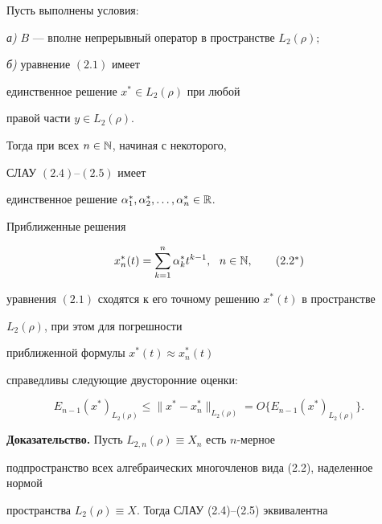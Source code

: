 \begin{thms}


Пусть выполнены условия${:}$





{\em а)} $B$ --- вполне непрерывный оператор в пространстве $L_2(\rho);$


{\em б)} уравнение $(2.1)$ имеет 


единственное решение $x^*\in L_2(\rho)$ при любой


правой части $y\in L_2(\rho)$.





Тогда при всех $n\in \Bbb N$, начиная с некоторого,


СЛАУ $(2.4)$--$(2.5)$ имеет


единственное решение $\alpha_1^*, \alpha_2^*, \dotsc, \alpha_n^* \in \Bbb R$.


Приближенные решения


\begin{equation}


x^*_n(t)=\sum_{k=1}^{n}\alpha_k^*t^{k-1},\ \ n\in \Bbb N,


\tag{$2.2^*$}


\end{equation}


уравнения $(2.1)$ сходятся к его точному решению $x^*(t)$ в пространстве


$L_2(\rho)$, при этом для погрешности


приближенной формулы $x^*(t)\approx x_n^*(t)$


справедливы следующие двусторонние оценки$:$


\begin{equation}


E_{n-1}(x^*)_{L_2(\rho)}\le \|x^*-x^*_n\|_{L_2(\rho)}=


O\{E_{n-1}(x^*)_{L_2(\rho)}\}.


\end{equation}


\end{thms}





{\bf Доказательство.} Пусть $L_{2,n}(\rho)\equiv X_n$ есть $n$-мерное


подпространство всех алгебраических многочленов вида (2.2), наделенное нормой


пространства $L_2(\rho)\equiv X$. Тогда СЛАУ (2.4)--(2.5) эквивалентна


